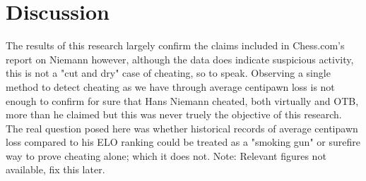 \documentclass[12pt, letterpaper, titlepage]{article}
\begin{document}
\section*{Discussion}
\label{sec:disc}

The results of this research largely confirm the claims included in Chess.com's report on Niemann however, although the data does indicate suspicious activity, this is not a "cut and dry" case of cheating, so to speak. Observing a single method to detect cheating as we have through average centipawn loss is not enough to confirm for sure that Hans Niemann cheated, both virtually and OTB, more than he claimed but this was never truely the objective of this research. The real question posed here was whether historical records of average centipawn loss compared to his ELO ranking could be treated as a "smoking gun" or surefire way to prove cheating alone; which it does not. Note: Relevant figures not available, fix this later. 



\end{document}
